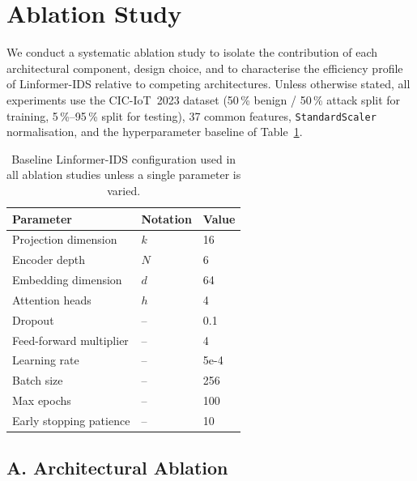
\section{Ablation Study}
\label{sec:ablation}

We conduct a systematic ablation study to isolate the contribution of each
architectural component, design choice, and to characterise the efficiency
profile of Linformer-IDS relative to competing architectures.
Unless otherwise stated, all experiments use the CIC-IoT~2023 dataset
(50\,\% benign / 50\,\% attack split for training, 5\,\%--95\,\% split for
testing), 37 common features, \texttt{StandardScaler} normalisation, and the
hyperparameter baseline of Table~\ref{tab:baseline_config}.

\begin{table}[h]
\centering
\caption{Baseline Linformer-IDS configuration used in all ablation studies
unless a single parameter is varied.}
\label{tab:baseline_config}
\begin{tabular}{lll}
\toprule
\textbf{Parameter} & \textbf{Notation} & \textbf{Value} \\
\midrule
Projection dimension     & $k$      & 16      \\
Encoder depth            & $N$      & 6       \\
Embedding dimension      & $d$      & 64      \\
Attention heads          & $h$      & 4       \\
Dropout                  & --       & 0.1     \\
Feed-forward multiplier  & --       & 4       \\
Learning rate            & --       & 5e-4    \\
Batch size               & --       & 256     \\
Max epochs               & --       & 100     \\
Early stopping patience  & --       & 10      \\
\bottomrule
\end{tabular}
\end{table}

\subsection{A. Architectural Ablation}
\label{sec:arch_ablation}

